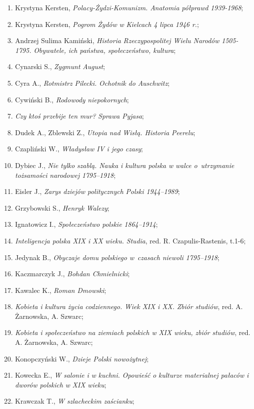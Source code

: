 \documentclass[a4paper,11pt]{article}
\begin{document}
\begin{enumerate}
{    sądowniczej i administracyjnej praktyki dóbr magnackich w wiekach
    XVI-XVIII};
\item Krystyna Kersten, \emph{Polacy-Żydzi-Komunizm. Anatomia półprawd
    1939-1968};
\item Krystyna Kersten, \emph{Pogrom Żydów w Kielcach 4 lipca 1946
    r.};
\item Andrzej Sulima Kamiński, \emph{Historia Rzeczypospolitej Wielu
    Narodów 1505-1795. Obywatele, ich państwa, społeczeństwo,
    kultura};
\item Cynarski S., \emph{Zygmunt August};
\item Cyra A., \emph{Rotmistrz Pilecki. Ochotnik do Auschwitz};
\item Cywiński B., \emph{Rodowody niepokornych};
\item \emph{Czy ktoś przebije ten mur? Sprawa Pyjasa};
\item Dudek A., Zblewski Z., \emph{Utopia nad Wisłą. Historia
    Peerelu};
\item Czapliński W., \emph{Władysław IV i jego czasy};
\item Dybiec J., \emph{Nie tylko szablą. Nauka i kultura polska w
    walce o~utrzymanie tożsamości narodowej 1795--1918};
\item Eisler J., \emph{Zarys dziejów politycznych Polski 1944--1989};
\item Grzybowski S., \emph{Henryk Walezy};
\item Ignatowicz I., \emph{Społeczeństwo polskie 1864--1914};
\item \emph{Inteligencja polska XIX i XX wieku. Studia}, red. R.
  Czapulis-Rastenis, t.1-6;
\item Jedynak B., \emph{Obyczaje domu polskiego w~czasach niewoli
    1795--1918};
\item Kaczmarczyk J., \emph{Bohdan Chmielnicki};
\item Kawalec K., \emph{Roman Dmowski};
\item \emph{Kobieta i kultura życia codziennego. Wiek XIX i XX. Zbiór
    studiów}, red. A. Żarnowska, A. Szwarc;
\item \emph{Kobieta i społeczeństwo na ziemiach polskich w XIX wieku,
    zbiór studiów}, red. A. Żarnowska, A. Szwarc;
\item Konopczyński W., \emph{Dzieje Polski nowożytnej};
\item Kowecka E., \emph{W salonie i w kuchni. Opowieść o kulturze
    materialnej pałaców i dworów polskich w XIX wieku};
\item Krawczak T., \emph{W szlacheckim zaścianku};

\end{enumerate}
\end{document}
